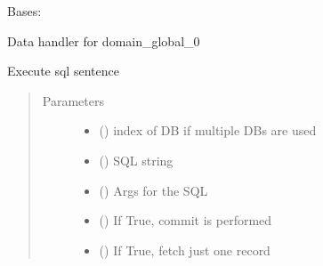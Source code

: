 \documentclass[letterpaper,10pt,english]{sphinxmanual}
\begin{document}

\begin{fulllineitems}
\label{\detokenize{bbc1.core.data_handler:bbc1.core.data_handler.DataHandlerDomain0}}
Bases: {\hyperref[\detokenize{bbc1.core.data_handler:bbc1.core.data_handler.DataHandler}]{}}

Data handler for domain\_global\_0

\begin{fulllineitems}
\label{\detokenize{bbc1.core.data_handler:bbc1.core.data_handler.DataHandlerDomain0.exec_sql}}
Execute sql sentence
\begin{quote}\begin{description}
\item[{Parameters}] \leavevmode\begin{itemize}
\item {} 
 () \textendash{} index of DB if multiple DBs are used

\item {} 
 () \textendash{} SQL string

\item {} 
 () \textendash{} Args for the SQL

\item {} 
 () \textendash{} If True, commit is performed

\item {} 
 () \textendash{} If True, fetch just one record


\end{itemize}
\end{description}
\end{quote}
\end{fulllineitems}
\end{fulllineitems}
\end{document}
